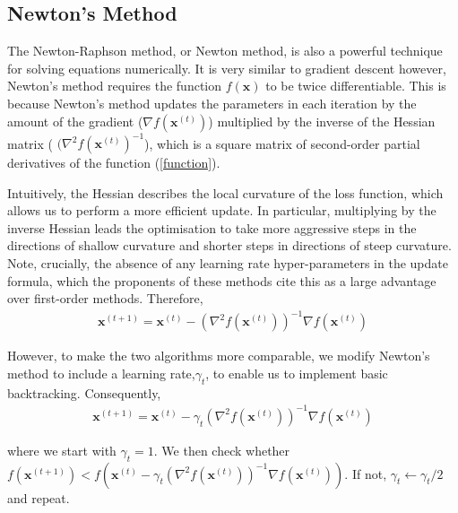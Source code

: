 \documentclass[12pt, authoryear]{elsarticle}
\begin{document}
\subsection{Newton's Method}

The Newton-Raphson method, or Newton method, is also a powerful technique for solving equations numerically. It is very similar to gradient descent however, Newton's method requires the function  $f(\boldsymbol{x})$ to be twice differentiable. This is because Newton's method updates the parameters in each iteration by the amount of the gradient ($ \nabla f ( { \boldsymbol { x }^ {( t)}})$) multiplied by the inverse of the Hessian matrix ( $( \nabla^{ 2 }f( { \boldsymbol { x}^ { ( t ) }})^{-1} $), which is a square matrix of second-order partial derivatives of the function (\ref{function}). 

Intuitively, the Hessian describes the local curvature of the loss function, which allows us to perform a more efficient update. In particular, multiplying by the inverse Hessian leads the optimisation to take more aggressive steps in the directions of shallow curvature and shorter steps in directions of steep curvature. Note, crucially, the absence of any learning rate hyper-parameters in the update formula, which the proponents of these methods cite this as a large advantage over first-order methods. Therefore, 
\begin{equation}
\begin{aligned}
\boldsymbol{x} ^ { ( t + 1 ) } = \boldsymbol{x} ^ { ( t ) } -  (\nabla^{ 2 }f( { \boldsymbol { x}^ { ( t ) }}))^{-1} \nabla f \left( \boldsymbol{x} ^ { ( t ) } \right)
\label{new_update}
\end{aligned}
\end{equation}

However, to make the two algorithms more comparable, we modify Newton's method to include a learning rate,$\gamma_{ t }$, to enable us to implement basic backtracking. Consequently,
\begin{equation}
\begin{aligned}
\boldsymbol{x} ^ { ( t + 1 ) } = \boldsymbol{x} ^ { ( t ) } -   \gamma_{ t } (\nabla^{ 2 }f( { \boldsymbol { x}^ { ( t ) }}))^{-1} \nabla f \left( \boldsymbol{x} ^ { ( t ) } \right)
\label{new_gamma_update}
\end{aligned}
\end{equation}

where we start with $\gamma_t = 1$. We then check whether $ f \left( \boldsymbol{x} ^ { ( t + 1 )} \right) <  f \left(   \boldsymbol{x} ^ { ( t ) } -  \gamma_{ t } (\nabla^{ 2 }f( { \boldsymbol { x}^ { ( t ) }}))^{-1} \nabla f \left( \boldsymbol{x} ^ { ( t ) } \right)\right)  $. If not, $\gamma_t \leftarrow \gamma_t/ 2$ and repeat.
\end{document}
